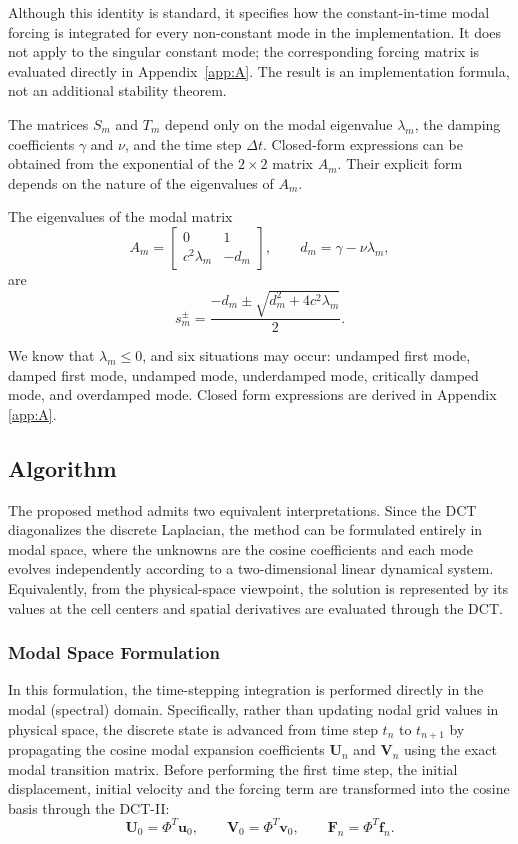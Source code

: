 \documentclass{Configuration_Files/PoliMi3i_thesis}
\newif\ifshowthesischanges
\DeclareRobustCommand{\thesischange}[2]{%
    \ifshowthesischanges
        \textcolor{#1}{#2}%
    \else
        #2%
    \fi
}
\def\thesischange#1#2{#2}%
\begin{document}
Although this identity is standard, it specifies how the constant-in-time
modal forcing is integrated for every non-constant mode in the implementation.
It does not apply to the singular constant mode; the corresponding forcing
matrix is evaluated directly in Appendix~\ref{app:A}. The result
is an implementation formula, not an additional stability theorem.

The matrices $S_m$ and $T_m$ depend only on the modal eigenvalue $\lambda_m$, the damping coefficients $\gamma$ and $\nu$, and the time step $\Delta t$. Closed-form expressions can be obtained from the exponential of the $2\times2$ matrix $A_m$. Their explicit form depends on the nature of the eigenvalues of $A_m$.

The eigenvalues of the modal matrix
\begin{equation*}
A_m=
\begin{bmatrix}
0 & 1\\
c^2\lambda_m & -d_m
\end{bmatrix},
\qquad
d_m=\gamma-\nu\lambda_m,
\end{equation*}
are
\begin{equation*}
s_m^\pm
=
\frac{-d_m\pm\sqrt{d_m^2+4c^2\lambda_m}}{2}.
\end{equation*}

We know that $\lambda_m\le0$, and six situations may occur: undamped first mode, damped first mode, undamped mode, underdamped mode, critically damped mode, and overdamped mode. Closed form expressions are derived in Appendix \ref{app:A}.

\subsection{Algorithm}
The proposed method admits two equivalent interpretations. Since the DCT diagonalizes the discrete Laplacian, the method can be formulated entirely in modal space, where the unknowns are the cosine coefficients and each mode evolves independently according to a two-dimensional linear dynamical system. Equivalently, from the physical-space viewpoint, the solution is represented by its values at the cell centers and spatial derivatives are evaluated through the DCT.

\subsubsection{Modal Space Formulation}
\thesischange{red}{In this formulation, the time-stepping integration is performed directly in the modal (spectral) domain. Specifically, rather than updating nodal grid values in physical space, the discrete state is advanced from time step $t_n$ to $t_{n+1}$ by propagating the cosine modal expansion coefficients $\mathbf{U}_n$ and $\mathbf{V}_n$ using the exact modal transition matrix.} Before performing the first time step, the initial displacement, initial velocity and the forcing term are transformed into the cosine basis through the DCT-II:
\begin{equation*}
\mathbf U_0
=
\Phi^T\mathbf u_0,
\qquad
\mathbf V_0
=
\Phi^T\mathbf v_0,
\qquad
\mathbf F_n
=
\Phi^T\mathbf f_n.
\end{equation*}
\end{document}
